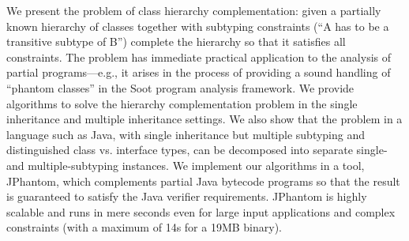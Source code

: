 
We present the problem of class hierarchy complementation: given a
partially known hierarchy of classes together with subtyping
constraints (``A has to be a transitive subtype of B'') complete the
hierarchy so that it satisfies all constraints. The problem has immediate
practical application to the analysis of partial programs---e.g., it
arises in the process of providing a sound handling of ``phantom
classes'' in the Soot program analysis framework. We provide
algorithms to solve the hierarchy complementation problem in the
single inheritance and multiple inheritance settings.
We also show that the problem in a language such as Java, with single
inheritance but multiple subtyping and distinguished class
vs. interface types, can be decomposed into separate single- and
multiple-subtyping instances.  We implement our algorithms in a
tool, JPhantom, which complements partial Java bytecode programs so that
the result is guaranteed to satisfy the Java verifier
requirements. JPhantom is highly scalable and runs in mere seconds
even for large input applications and complex constraints (with a maximum
of 14s for a 19MB binary).


%



